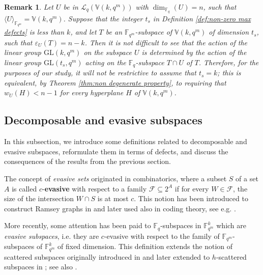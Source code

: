 \documentclass[11pt]{amsart}
\newtheorem{remark}[theorem]{Remark}
\newcommand{\fqm}{\mathbb{F}_{q^m}}
\newcommand{\fq}{{\mathbb F}_{q}}
\newcommand{\Fm}{\mathbb{F}_{q^m}}
\begin{document}
\begin{remark}
Let $U$ be in $\mathcal{L}_q(\mathbb{V}(k,q^m))$ with $\dim_{\fq} (U)=n$, such that $\langle U\rangle_{\fqm}=\mathbb{V}(k,q^m)$. Suppose that the integer $t_s$ in Definition \ref{def:non-zero max defects} is less than $k$, and let $T$ be an $\fqm$-subspace of $\mathbb{V}(k,q^m)$ of dimension $t_s$, such that $\varepsilon_U(T)=n-k$.
Then it is not difficult to see that the action of the linear group $\mathrm{GL}(k,q^m)$ on the subspace $U$ is determined by the action of the linear group $\mathrm{GL}(t_s, q^m)$  acting on the $\fq$-subspace $T\cap U$ of $T$. Therefore, for the purposes of our study, it will  not be restrictive to assume that  $t_s=k$;  this is equivalent, by Theorem \ref{thm:non degenerate property}, to requiring that $w_U(H)<n-1$ for every  hyperplane $H$ of $\mathbb{V}(k,q^m)$.
\end{remark}


\subsection{Decomposable and evasive subspaces}

In this subsection, we introduce some definitions related to  decomposable and evasive subspaces, reformulate them in terms of defects, and discuss the consequences of the results from the previous section.

The concept of {\it evasive sets} originated in combinatorics, where a subset $S$ of a set 
$A$ is called $c$-\textbf{evasive} with respect to a family $\mathcal{F}\subseteq 2^A$ if for every $W \in \mathcal{F}$, the size of the intersection $W\cap S$ is at most $c$.
This notion has been introduced to construct Ramsey graphs in \cite{pudlak2004pseudorandom} and later used also in coding theory, see e.g. \cite{sudakov2024evasive,guruswami2013list,guruswami2016explicit}.

More recently, some attention has been paid to $\fq$-subspaces in $\Fm^k$ which are \emph{evasive subspaces}, i.e. they are $c$-evasive with respect to the family of $\Fm$-subspaces of $\Fm^k$ of fixed dimension. 
This definition extends the notion of scattered subspaces originally introduced in \cite{blokhuis2000scattered} and later extended to $h$-scattered subspaces in \cite{lunardon2017mrd,sheekeyVdV,csajbok2021generalising}; see also \cite{bartoli2021evasive,gruica2022generalised}.
\end{document}
